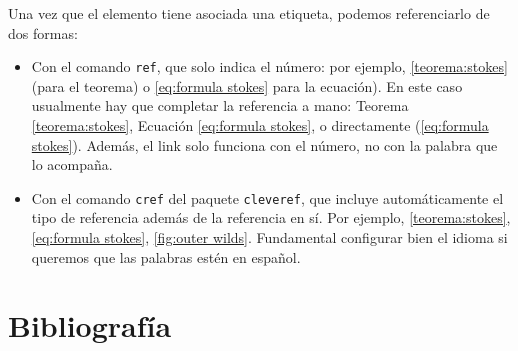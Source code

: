 \documentclass[12pt, spanish]{article}
\theoremstyle{definition} %
\theoremstyle{remark} %
\theoremstyle{plain} %
\theoremstyle{plain} %
\theoremstyle{plain} %
\theoremstyle{plain} %
\theoremstyle{plain} %
\theoremstyle{remark} %
\begin{document}
Una vez que el elemento tiene asociada una etiqueta, podemos referenciarlo de dos formas:
\begin{itemize}
    \item Con el comando \verb|ref|, que solo indica el número: por ejemplo, \ref{teorema:stokes} (para el teorema) o \ref{eq:formula stokes} para la ecuación). En este caso usualmente hay que completar la referencia a mano: Teorema \ref{teorema:stokes}, Ecuación \ref{eq:formula stokes}, o directamente (\ref{eq:formula stokes}). Además, el link solo funciona con el número, no con la palabra que lo acompaña.
    \item Con el comando \verb|cref| del paquete \verb|cleveref|, que incluye automáticamente el tipo de referencia además de la referencia en sí. Por ejemplo, \cref{teorema:stokes}, \cref{eq:formula stokes}, \cref{fig:outer wilds}. Fundamental configurar bien el idioma si queremos que las palabras estén en español.
\end{itemize}

\section{Bibliografía}
\end{document}
